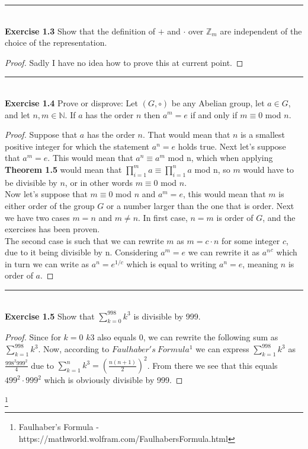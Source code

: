 \documentclass{article}
\begin{document}
\noindent\rule{12cm}{0.4pt}\\
\noindent \textbf{Exercise 1.3} Show that the definition of $+$ and $\cdot$ over $\mathbb{Z}_m$ are independent of the choice of the representation.
\begin{proof}
Sadly I have no idea how to prove this at current point.
\end{proof}



\noindent\rule{12cm}{0.4pt}\\
\noindent \textbf{Exercise 1.4} Prove or disprove: Let $(G, \circ)$ be any Abelian group, let $a \in G$, and let $n, m \in \mathbb{N}$. If $a$ has the order $n$ then $a^m=e$ if and only if $m \equiv 0$ mod $n$.
\begin{proof}
Suppose that $a$ has the order $n$. That would mean that $n$ is a smallest positive integer for which the statement $a^n=e$ holds true. Next let's suppose that $a^m=e$. This would mean that $a^n \equiv a^m$ mod n, which when applying \textbf{Theorem 1.5} would mean that $\prod_{i=1}^{m} a \equiv \prod_{i=1}^{n} a$ mod n, so $m$ would have to be divisible by $n$, or in other words $m \equiv 0$ mod $n$.\\
Now let's suppose that $m \equiv 0$ mod $n$ and $a^m=e$, this would mean that $m$ is either order of the group $G$ or a number larger than the one that is order. Next we have two cases $m=n$ and $m \neq n$. In first case, $n=m$ is order of $G$, and the exercises has been proven.\\
The second case is such that we can rewrite $m$ as $m=c\cdot n$ for some integer $c$, due to it being divisible by n. Considering $a^m=e$ we can rewrite it as ${a^n}^c$ which in turn we can write as $a^n=e^{1/c}$ which is equal to writing $a^n=e$, meaning $n$ is order of $a$.
\end{proof}



\noindent\rule{12cm}{0.4pt}\\
\noindent \textbf{Exercise 1.5} Show that $\sum_{k=0}^{998} k^3$ is divisible by 999.
\begin{proof}
Since for $k=0$ $k3$ also equals 0, we can rewrite the following sum as $\sum_{k=1}^{998} k^3$. Now, according to $Faulhaber's\ Formula^1$ we can express $\sum_{k=1}^{998} k^3$ as $\frac{998^2 999^2}{4}$ due to $\sum_{k=1}^{n} k^3=\left( \frac{n(n+1)}{2}\right)^2$. From there we see that this equals $499^2 \cdot 999^2$ which is obviously divisible by 999.
\end{proof}
\footnote{Faulhaber's Formula - https://mathworld.wolfram.com/FaulhabersFormula.html}
\end{document}
